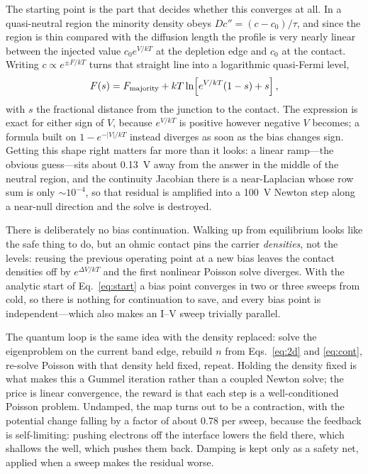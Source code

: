 \documentclass[preprint,12pt]{elsarticle}
\begin{document}
The starting point is the part that decides whether this converges at all. In a
quasi-neutral region the minority density obeys $Dc''=(c-c_0)/\tau$, and since
the region is thin compared with the diffusion length the profile is very
nearly linear between the injected value $c_0e^{V/kT}$ at the depletion edge
and $c_0$ at the contact. Writing $c\propto e^{\pm F/kT}$ turns that straight
line into a logarithmic quasi-Fermi level,
\begin{equation}
  F(s) = F_{\rm majority} + kT\ln\!\left[e^{V/kT}(1-s)+s\right],
  \label{eq:start}
\end{equation}
with $s$ the fractional distance from the junction to the contact. The
expression is exact for either sign of $V$, because $e^{V/kT}$ is positive
however negative $V$ becomes; a formula built on $1-e^{-|V|/kT}$ instead
diverges as soon as the bias changes sign. Getting this shape right matters far
more than it looks: a linear ramp---the obvious guess---sits about
\SI{0.13}{V} away from the answer in the middle of the neutral region, and the
continuity Jacobian there is a near-Laplacian whose row sum is only
$\sim10^{-4}$, so that residual is amplified into a \SI{100}{V} Newton step
along a near-null direction and the solve is destroyed.

There is deliberately no bias continuation. Walking up from equilibrium looks
like the safe thing to do, but an ohmic contact pins the carrier
\emph{densities}, not the levels: reusing the previous operating point at a new
bias leaves the contact densities off by $e^{\Delta V/kT}$ and the first
nonlinear Poisson solve diverges. With the analytic start of
Eq.~\eqref{eq:start} a bias point converges in two or three sweeps from cold,
so there is nothing for continuation to save, and every bias point is
independent---which also makes an I--V sweep trivially parallel.

The quantum loop is the same idea with the density replaced: solve the
eigenproblem on the current band edge, rebuild $n$ from Eqs.~\eqref{eq:2d}
and \eqref{eq:cont}, re-solve Poisson with that density held fixed, repeat.
Holding the density fixed is what makes this a Gummel iteration rather than a
coupled Newton solve; the price is linear convergence, the reward is that each
step is a well-conditioned Poisson problem. Undamped, the map turns out to be a
contraction, with the potential change falling by a factor of about $0.78$ per
sweep, because the feedback is self-limiting: pushing electrons off the
interface lowers the field there, which shallows the well, which pushes them
back. Damping is kept only as a safety net, applied when a sweep makes the
residual worse.
\end{document}
